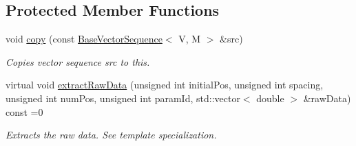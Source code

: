 \subsection*{Protected Member Functions}
\begin{DoxyCompactItemize}
\item 
void \hyperlink{class_q_u_e_s_o_1_1_base_vector_sequence_a35629a6937e22752e3b252e84457e791}{copy} (const \hyperlink{class_q_u_e_s_o_1_1_base_vector_sequence}{Base\-Vector\-Sequence}$<$ V, M $>$ \&src)
\begin{DoxyCompactList}\small\item\em Copies vector sequence {\ttfamily src} to {\ttfamily this}. \end{DoxyCompactList}\item 
virtual void \hyperlink{class_q_u_e_s_o_1_1_base_vector_sequence_aae5259810d72d393328369d8d4087d5d}{extract\-Raw\-Data} (unsigned int initial\-Pos, unsigned int spacing, unsigned int num\-Pos, unsigned int param\-Id, std\-::vector$<$ double $>$ \&raw\-Data) const =0
\begin{DoxyCompactList}\small\item\em Extracts the raw data. See template specialization. \end{DoxyCompactList}\end{DoxyCompactItemize}
